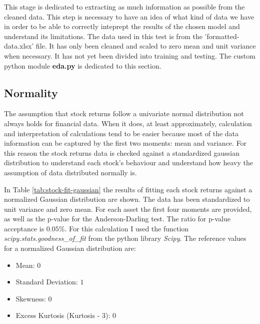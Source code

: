 This stage is dedicated to extracting as much information as possible from the cleaned data. This step is necessary to have an idea of what kind of data we have in order to be able to correctly inteprept the results of the chosen model and understand its limitations.
The data used in this test is from the 'formatted-data.xlsx' file. It has only been cleaned and scaled to zero mean and unit variance when necessary. It has not yet been divided into training and testing.
The custom python module \textbf{eda.py} is dedicated to this section.

\subsection{Normality}
The assumption that stock returns follow a univariate normal distribution not always holds for financial data. When it does, at least approximately, calculation and interpretation of calculations tend to be easier because most of the data information can be captured by the first two moments: mean and variance. For this reason the stock returns data is checked against a standardized gaussian distribution to understand each stock's behaviour and understand how heavy the assumption of data distributed normally is.

In Table \ref{tab:stock-fit-gaussian} the results of fitting each stock returns against a normalized Gaussian distribution are shown. The data has been standardized to unit variance and zero mean. For each asset the first four moments are provided, as well as  the p-value for the Anderson-Darling test. The ratio for p-value acceptance is $0.05\%$. For this calculation I used the function \textit{scipy.stats.goodness\_of\_fit} from the python library \textit{Scipy}.
The reference values for a normalized Gaussian distribution are:
\begin{itemize}
    \item Mean: $0$
    \item Standard Deviation: $1$
    \item Skewness: $0$
    \item Excess Kurtosis (Kurtosis - $3$): $0$
\end{itemize}

